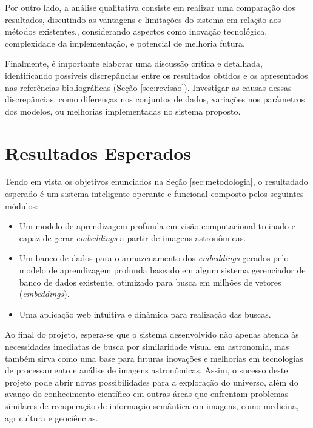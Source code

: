 \documentclass[a4,12pt]{horizon-theme}
\begin{document}
Por outro lado, a análise qualitativa consiste em realizar uma comparação dos resultados, discutindo as vantagens e limitações do sistema em relação aos métodos existentes., considerando aspectos como inovação tecnológica, complexidade da implementação, e potencial de melhoria futura.

Finalmente, é importante elaborar uma discussão crítica e detalhada, identificando  possíveis discrepâncias entre os resultados obtidos e os apresentados nas referências bibliográficas (Seção \ref{sec:revisao}). Investigar as causas dessas discrepâncias, como diferenças nos conjuntos de dados, variações nos parâmetros dos modelos, ou melhorias implementadas no sistema proposto.






\section{Resultados Esperados}
\label{sec:resultados}
Tendo em vista os objetivos enunciados na Seção \ref{sec:metodologia}, o resultadado esperado é um sistema inteligente operante e funcional composto pelos seguintes módulos:
\begin{itemize}
  \item Um modelo de aprendizagem profunda em visão computacional treinado e capaz de gerar \emph{embeddings} a partir de imagens astronômicas.
  \item Um banco de dados para o armazenamento dos \emph{embeddings} gerados pelo modelo de aprendizagem profunda baseado em algum sistema gerenciador de banco de dados existente, otimizado para busca em milhões de vetores (\emph{embeddings}).
  \item Uma aplicação web intuitiva e dinâmica para realização das buscas.
\end{itemize}

Ao final do projeto, espera-se que o sistema desenvolvido não apenas atenda às necessidades imediatas de busca por similaridade visual em astronomia, mas também sirva como uma base para futuras inovações e melhorias em tecnologias de processamento e análise de imagens astronômicas. Assim, o sucesso deste projeto pode abrir novas possibilidades para a exploração do universo, além do avanço do conhecimento científico em outras áreas que enfrentam problemas similares de recuperação de informação semântica em imagens, como medicina, agricultura e geociências.
\end{document}
